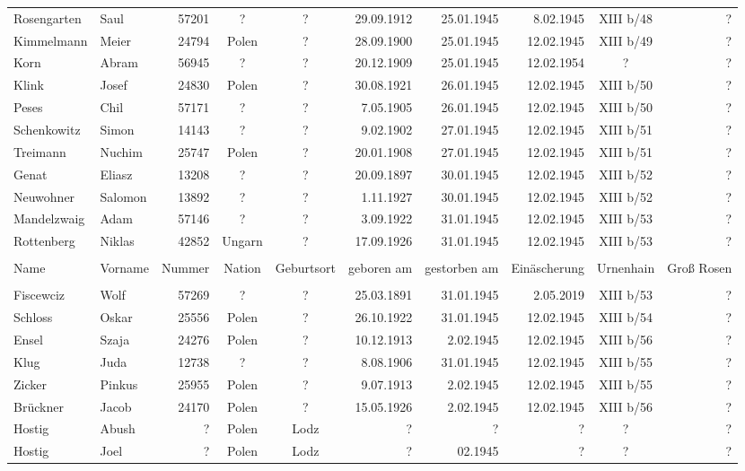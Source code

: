 \documentclass[a4paper,12pt,ngerman,
]{nisebook}
\begin{document}
\begin{tiny}
\begin{longtable}[l]{|l|l|r|c|c|r|r|r|c|r|}
Rosengarten  &  Saul  & 57201 &  ?  &  ?  & 29.09.1912 & 25.01.1945 & 8.02.1945 &  XIII b/48  &  ? \\[3pt]
Kimmelmann  &  Meier  & 24794 &  Polen  &  ?  & 28.09.1900 & 25.01.1945 & 12.02.1945 &  XIII b/49  &  ? \\[3pt]
Korn  &  Abram  & 56945 &  ?  &  ?  & 20.12.1909 & 25.01.1945 & 12.02.1954 &  ?  &  ? \\[3pt]
Klink  &  Josef  & 24830 &  Polen  &  ?  & 30.08.1921 & 26.01.1945 & 12.02.1945 &  XIII b/50  &  ? \\[3pt]
Peses  &  Chil  & 57171 &  ?  &  ?  & 7.05.1905 & 26.01.1945 & 12.02.1945 &  XIII b/50  &  ? \\[3pt]
Schenkowitz  &  Simon  & 14143 &  ?  &  ?  & 9.02.1902 & 27.01.1945 & 12.02.1945 &  XIII b/51  &  ? \\[3pt]
Treimann  &  Nuchim  & 25747 &  Polen  &  ?  & 20.01.1908 & 27.01.1945 & 12.02.1945 &  XIII b/51  &  ? \\[3pt]
Genat  &  Eliasz  & 13208 &  ?  &  ?  & 20.09.1897 & 30.01.1945 & 12.02.1945 &  XIII b/52  &  ? \\[3pt]
Neuwohner  &  Salomon  & 13892 &  ?  &  ?  & 1.11.1927 & 30.01.1945 & 12.02.1945 &  XIII b/52  &  ? \\[3pt]
Mandelzwaig  &  Adam  & 57146 &  ?  &  ?  & 3.09.1922 & 31.01.1945 & 12.02.1945 &  XIII b/53  &  ? \\[3pt]
Rottenberg  &  Niklas  & 42852 &  Ungarn  &  ?  & 17.09.1926 & 31.01.1945 & 12.02.1945 &  XIII b/53  &  ? \\[3pt]

\hline\pagebreak\hline  & \\[-9pt]
Name  &  Vorname  &  Nummer  &  Nation  &  Geburtsort  &  geboren am  &  gestorben am  &  Einäscherung  &  Urnenhain  &  Groß Rosen \\[3pt]
\hline  & \\[-9pt]

Fiscewciz  &  Wolf  & 57269 &  ?  &  ?  & 25.03.1891 & 31.01.1945 & 2.05.2019 &  XIII b/53  &  ? \\[3pt]
Schloss  &  Oskar  & 25556 &  Polen  &  ?  & 26.10.1922 & 31.01.1945 & 12.02.1945 &  XIII b/54  &  ? \\[3pt]
Ensel  &  Szaja  & 24276 &  Polen  &  ?  & 10.12.1913 & 2.02.1945 & 12.02.1945 &  XIII b/56  &  ? \\[3pt]
Klug  &  Juda  & 12738 &  ?  &  ?  & 8.08.1906 & 31.01.1945 & 12.02.1945 &  XIII b/55  &  ? \\[3pt]
Zicker  &  Pinkus  & 25955 &  Polen  &  ?  & 9.07.1913 & 2.02.1945 & 12.02.1945 &  XIII b/55  &  ? \\[3pt]
Brückner  &  Jacob  & 24170 &  Polen  &  ?  			& 15.05.1926 	& 2.02.1945 & 12.02.1945 &  XIII b/56  &  ? \\[3pt]
Hostig  &  Abush  &  ?  		&  Polen  &  Lodz 	 &  ?  					& ?  				& ?  				&  ? & ?\\[3pt] 
Hostig  &  Joel  &  ?  			&  Polen  &  Lodz 	 &  ?  &  02.1945 	 & ?  &  ? & ?\\
\hline
\end{longtable}
\end{tiny}
\end{document}
